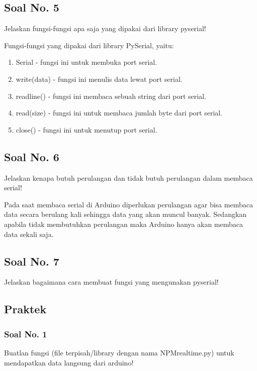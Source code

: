 \subsection{Soal No. 5}
Jelaskan fungsi-fungsi apa saja yang dipakai dari library pyserial!

Fungsi-fungsi yang dipakai dari library PySerial, yaitu:
\begin{enumerate}
	\item Serial - fungsi ini untuk membuka port serial.
	\item write(data) - fungsi ini menulis data lewat port serial.
	\item readline() - fungsi ini membaca sebuah string dari port serial.
	\item read(size) - fungsi ini untuk membaca jumlah byte dari port serial.
	\item close() - fungsi ini untuk menutup port serial.
\end{enumerate}

\subsection{Soal No. 6}
Jelaskan kenapa butuh perulangan dan tidak butuh perulangan dalam membaca serial!

Pada saat membaca serial di Arduino diperlukan perulangan agar bisa membaca data secara berulang kali sehingga data yang akan muncul banyak. Sedangkan apabila tidak membutuhkan perulangan maka Arduino hanya akan membaca data sekali saja.

\subsection{Soal No. 7}
Jelaskan bagaimana cara membuat fungsi yang mengunakan pyserial!


\subsection{Praktek}
\subsubsection{Soal No. 1}
Buatlan fungsi (file terpisah/library dengan nama NPMrealtime.py) untuk mendapatkan data langsung dari arduino!



